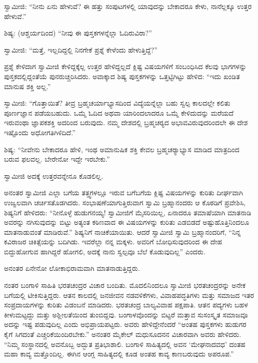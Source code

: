  ಸ್ವಾಮೀಜಿ: “ನೀನು ಏನು ಹೇಳುವೆ? ಈ ಹತ್ತು ಸಂಪುಟಗಳಲ್ಲಿ ಯಾವುದನ್ನು ಬೇಕಾದರೂ ಕೇಳು, ನಾನೆಲ್ಲಕ್ಕೂ ಉತ್ತರ ಹೇಳುವೆ.” 

 ಶಿಷ್ಯ: (ಆಶ್ಚರ್ಯದಿಂದ) “ನೀವು ಈ ಪುಸ್ತಕಗಳನ್ನೆಲ್ಲಾ ಓದಿರುವಿರಾ?” 

 ಸ್ವಾಮೀಜಿ: “ಮತ್ತೆ, ಇಲ್ಲದಿದ್ದಲ್ಲಿ ನಿನಗೇಕೆ ಪ್ರಶ್ನೆ ಕೇಳೆಂದು ಹೇಳುತ್ತಿದ್ದೆ?” 

 ಪ್ರಶ್ನೆ ಕೇಳಿದಾಗ ಸ್ವಾಮೀಜಿ ಕೇಳಿದ್ದಕ್ಕೆಲ್ಲ ಉತ್ತರ ಹೇಳಿದ್ದಲ್ಲದೆ ಕ್ಲಿಷ್ಟ ವಿಷಯಗಳಿಗೆ ಸಂಬಂಧಿಸಿದ ಕೆಲವು ಭಾಗಗಳನ್ನು ಪುಸ್ತಕದಲ್ಲಿದ್ದಂತೆಯೆ ಪುನರುಚ್ಚರಿಸಿದರು. ಅವಾಕ್ಕಾದ ಶಿಷ್ಯ ಪುಸ್ತಕಗಳನ್ನು ಒತ್ತಟ್ಟಿಗಿಟ್ಟು ಹೇಳಿದ: “ಇದು ಖಂಡಿತ ಮಾನುಷ ಶಕ್ತಿ ಅಲ್ಲ.” 

 ಸ್ವಾಮೀಜಿ: “ಗೊತ್ತಾಯಿತೆ? ತೀವ್ರ ಬ್ರಹ್ಮಚರ್ಯಾಭ್ಯಾಸದಿಂದ ವಿದ್ಯೆಯನ್ನೆಲ್ಲಾ ಬಹು ಸ್ವಲ್ಪ ಕಾಲದಲ್ಲೇ ಕಲಿತು ಪೂರ್ಣಜ್ಞಾನ ಪಡೆಯಬಹುದು. ಒಮ್ಮೆ ಓದಿದ ಅಥವಾ ಯಾರಿಂದಲಾದರೂ ಒಮ್ಮೆ ಕೇಳಿದುದನ್ನು ಮರೆಯದೆ ಇರುವಂಥಾ ಜ್ಞಾಪಕಶಕ್ತಿ ಅದರಿಂದ ಬರುವುದು. ನಮ್ಮ ದೇಶದಲ್ಲಿ ಬ್ರಹ್ಮಚರ‍್ಯದ ಅಭಾವವಿರುವುದರಿಂದಲೇ ಈ ದೇಶ ಇಷ್ಟೊಂದು ಅಧೋಗತಿಗಿಳಿದಿದೆ.” 

 ಶಿಷ್ಯ: “ನೀವೇನು ಬೇಕಾದರೂ ಹೇಳಿ, ಇಂಥ ಅಮಾನುಷಿಕ ಶಕ್ತಿ ಕೇವಲ ಬ್ರಹ್ಮಚರ‍್ಯಾಭ್ಯಾಸ ಮಾಡಿದ ಮಾತ್ರದಿಂದ ಬರುವ ಫಲವಲ್ಲ. ಬೇರೇನೋ ಇದ್ದೇ ಇರಬೇಕು.” 

 ಸ್ವಾಮೀಜಿ ಅದಕ್ಕೆ ಉತ್ತರವನ್ನೇನೂ ಕೊಡಲಿಲ್ಲ. 

 ಅನಂತರ ಸ್ವಾಮೀಜಿ ಎಲ್ಲಾ ಬಗೆಯ ತತ್ತ್ವಗಳಲ್ಲೂ ಇರುವ ಬಗೆಬಗೆಯ ಕ್ಲಿಷ್ಟ ವಿಷಯಗಳನ್ನು ಕುರಿತು ದೀರ್ಘವಾಗಿ ಉಜ್ವಲವಾಗಿ ಚರ್ಚಿಸತೊಡಗಿದರು. ಸಂಭಾಷಣೆಯಾಗುತ್ತಿರುವಾಗ ಸ್ವಾಮಿ ಬ್ರಹ್ಮಾನಂದರು ಆ ಕೊಠಡಿಗೆ ಪ್ರವೇಶಿಸಿ, ಶಿಷ್ಯನಿಗೆ ಹೇಳಿದರು: “ನೀನೊಳ್ಳೆ ಹುಡುಗನಯ್ಯ! ಸ್ವಾಮೀಜಿಗೆ ಮೈಸರಿಯಿಲ್ಲ, ಏನಾದರೂ ತಮಾಷೆಯಾಗಿ ಮಾತನಾಡಿ ಅವರನ್ನು ನಗಿಸುವುದನ್ನು ಬಿಟ್ಟು ಅತ್ಯಂತ ಕಠಿಣವಾದ ಈ ವಿಷಯಗಳನ್ನು ಕುರಿತು ಎಡಬಿಡದೆ ಅಷ್ಟುಹೊತ್ತಿನಿಂದಲೂ ಮಾತನಾಡುವಂತೆ ಮಾಡಿರುವೆ.” ಶಿಷ್ಯನಿಗೆ ನಾಚಿಕೆಯಾಯಿತು. ಆದರೆ ಸ್ವಾಮೀಜಿ ಸ್ವಾಮಿ ಬ್ರಹ್ಮಾನಂದರಿಗೆ, “ನಿನ್ನ ಕವಿರಾಜರ ಚಿಕಿತ್ಸೆಯನ್ನು ಬದಿಗಿಡು. ಇವರೆಲ್ಲಾ ನನ್ನ ಮಕ್ಕಳು. ಅವರಿಗೆ ಬೋಧಿಸುವುದರಿಂದ ಈ ದೇಹ ಬಿದ್ದುಹೋಗುವ ಹಾಗಿದ್ದರೆ ಹೋಗಲಿ, ಅದಕ್ಕೆ ನಾನು ಸ್ವಲ್ಪವೂ ಬೆಲೆ ಕೊಡುವುದಿಲ್ಲ” ಎಂದರು. 

 ಅನಂತರ ಏನೇನೋ ಲೋಕಾಭಿರಾಮವಾಗಿ ಮಾತನಾಡುತ್ತಿದ್ದರು. 

 ನಂತರ ಬಂಗಾಳಿ ಸಾಹಿತಿ ಭರತಚಂದ್ರರ ವಿಚಾರ ಬಂದಿತು. ಮೊದಲಿನಿಂದಲೂ ಸ್ವಾಮೀಜಿ ಭರತಚಂದ್ರರನ್ನು ಅನೇಕ ಬಗೆಯಲ್ಲಿ ಟೀಕಿಸುತ್ತಿದ್ದರು. ಆತನ ಕಾಲದಲ್ಲಿ ಜನಜೀವನ ನಡವಳಿಕೆಗಳು, ವಿವಾಹಪದ್ಧತಿಗಳು ಮತ್ತು ಸಮಾಜದ ಇತರ ಸಂಪ್ರದಾಯಗಳನ್ನು ಕುರಿತು ವಿಡಂಬನೆ ಮಾಡಿದರು. ಭರತಚಂದ್ರ ಬಾಲ್ಯವಿವಾಹ ಪಕ್ಷಪಾತಿ. ಆತನ ಪದ್ಯಗಳು ಬಹಳ ಕೀಳುಮಟ್ಟದ್ದು ಮತ್ತು ಅಶ್ಲೀಲತೆಯಿಂದ ತುಂಬಿದ್ದವು. ಬಂಗಾಳವೊಂದನ್ನು ಬಿಟ್ಟರೆ ಮತ್ತಾವ ಸುಸಂಸ್ಕೃತ ಸಮಾಜವೂ ಅದನ್ನು ಇಷ್ಟ ಪಡುವುದಿಲ್ಲ ಎಂದು ಅಭಿಪ್ರಾಯಪಟ್ಟರು. ಅವರು ಹೇಳಿದ್ದೇನೆಂದರೆ “ಅಂತಹ ಪುಸ್ತಕಗಳು ಹುಡುಗರ ಕೈಗೆ ಸಿಗದಂತೆ ಎಚ್ಚರಿಕೆಯಿಂದಿರಬೇಕು.” ಅನಂತರ ಮೈಕೇಲ್ ಮಧುಸೂದನನ ವಿಚಾರವಾಗಿ ಅವರು ಹೇಳಿದರು. “ನಿಮ್ಮ ಸಂಸ್ಥಾನದಲ್ಲಿ ಅವನೊಬ್ಬ ಅದ್ಭುತ ಪ್ರತಿಭಾಶಾಲಿ. ಬಂಗಾಳಿ ಸಾಹಿತ್ಯದಲ್ಲಿ ಅವನ ‘ಮೇಘನಾದವಧ’ ದಂತಹ ಮಹಾ ಕಾವ್ಯ ಮತ್ತೊಂದಿಲ್ಲ. ಈಗಿನ ಆಂಗ್ಲ ಸಾಹಿತ್ಯದಲ್ಲಿ ಕೂಡ ಅಂತಹ ಕಾವ್ಯ ಕಾಣಬರುವುದು ಅಪರೂಪ.” 

